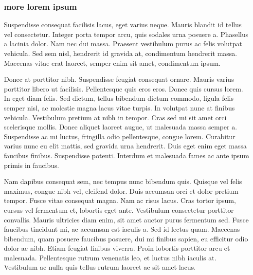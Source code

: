 \documentclass{jamk-report}
\begin{document}
\subsubsection{more lorem ipsum}

Suspendisse consequat facilisis lacus, eget varius neque. Mauris blandit id
tellus vel consectetur. Integer porta tempor arcu, quis sodales urna posuere a.
Phasellus a lacinia dolor. Nam nec dui massa. Praesent vestibulum purus ac
felis volutpat vehicula. Sed sem nisl, hendrerit id gravida at, condimentum
hendrerit massa.  Maecenas vitae erat laoreet, semper enim sit amet,
condimentum ipsum.

Donec at porttitor nibh. Suspendisse feugiat consequat ornare.  Mauris varius
porttitor libero ut facilisis. Pellentesque quis eros eros. Donec quis cursus
lorem. In eget diam felis. Sed dictum, tellus bibendum dictum commodo, ligula
felis semper nisl, ac molestie magna lacus vitae turpis. In volutpat nunc at
finibus vehicula. Vestibulum pretium at nibh in tempor. Cras sed mi sit amet
orci scelerisque mollis. Donec aliquet laoreet augue, ut malesuada massa semper
a. Suspendisse ac mi luctus, fringilla odio pellentesque, congue lorem.
Curabitur varius nunc eu elit mattis, sed gravida urna hendrerit. Duis eget
enim eget massa faucibus finibus. Suspendisse potenti. Interdum et malesuada
fames ac ante ipsum primis in faucibus.

Nam dapibus consequat sem, nec tempus nunc bibendum quis. Quisque vel felis
maximus, congue nibh vel, eleifend dolor. Duis accumsan orci et dolor pretium
tempor. Fusce vitae consequat magna. Nam ac risus lacus. Cras tortor ipsum,
cursus vel fermentum et, lobortis eget ante. Vestibulum consectetur porttitor
convallis. Mauris ultricies diam enim, sit amet auctor purus fermentum sed.
Fusce faucibus tincidunt mi, ac accumsan est iaculis a. Sed id lectus quam.
Maecenas bibendum, quam posuere faucibus posuere, dui mi finibus sapien, eu
efficitur odio dolor ac nibh. Etiam feugiat finibus viverra. Proin lobortis
porttitor arcu et malesuada.  Pellentesque rutrum venenatis leo, et luctus nibh
iaculis at.  Vestibulum ac nulla quis tellus rutrum laoreet ac sit amet lacus.

\end{document}
